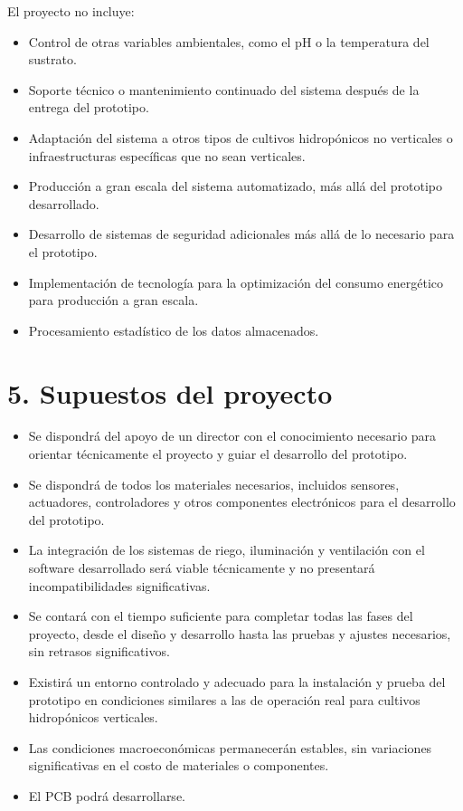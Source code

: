 \documentclass[
11pt, %
]{charter}
\begin{document}
El proyecto no incluye:
\begin{itemize}
	\item Control de otras variables ambientales, como el pH o la temperatura del sustrato.
	\item Soporte técnico o mantenimiento continuado del sistema después de la entrega del prototipo.
	\item Adaptación del sistema a otros tipos de cultivos hidropónicos no verticales o infraestructuras específicas que no sean verticales.
	\item Producción a gran escala del sistema automatizado, más allá del prototipo desarrollado.
	\item Desarrollo de sistemas de seguridad adicionales más allá de lo necesario para el prototipo.
	\item Implementación de tecnología para la optimización del consumo energético para producción a gran escala.
	\item Procesamiento estadístico de los datos almacenados.
	
\end{itemize}




\section{5. Supuestos del proyecto}
\label{sec:supuestos}


\begin{itemize}
	\item Se dispondrá del apoyo de un director con el conocimiento necesario para orientar técnicamente el proyecto y guiar el desarrollo del prototipo.
	\item Se dispondrá de todos los materiales necesarios, incluidos sensores, actuadores, controladores y otros componentes electrónicos para el desarrollo del prototipo.
	\item La integración de los sistemas de riego, iluminación y ventilación con el software desarrollado será viable técnicamente y no presentará incompatibilidades significativas.
	\item  Se contará con el tiempo suficiente para completar todas las fases del proyecto, desde el diseño y desarrollo hasta las pruebas y ajustes necesarios, sin retrasos significativos.
	\item Existirá un entorno controlado y adecuado para la instalación y prueba del prototipo en condiciones similares a las de operación real para cultivos hidropónicos verticales.
	\item Las condiciones macroeconómicas permanecerán estables, sin variaciones significativas en el costo de materiales o componentes.
	\item El PCB podrá desarrollarse.
\end{itemize}
\end{document}
